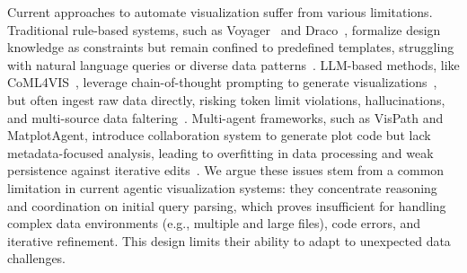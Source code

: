 \documentclass[11pt, a4paper, logo, copyright]{googlecloud}
\begin{document}
Current approaches to automate visualization suffer from various limitations. Traditional rule-based systems, such as Voyager~\citep{10.1145/3025453.3025768,7192728} and Draco~\citep{yang2023draco}, formalize design knowledge as constraints but remain confined to predefined templates, struggling with natural language queries or diverse data patterns~\citep{wu2024automated,hoque2025natural}. 
LLM-based methods, like CoML4VIS~\citep{chen2024viseval}, leverage chain-of-thought prompting to generate visualizations~\citep{comanici2025gemini}, but often ingest raw data directly, risking token limit violations, hallucinations, and multi-source data faltering~\citep{bai2024hallucination,chen2024viseval}.
Multi-agent frameworks, such as VisPath and MatplotAgent, introduce collaboration system to generate plot code but lack metadata-focused analysis, leading to overfitting in data processing and weak persistence against iterative edits~\citep{seo2025automated,yang2024matplotagent}. 
We argue these issues stem from a common limitation in current agentic visualization systems: they concentrate reasoning and coordination on initial query parsing, which proves insufficient for handling complex data environments (e.g., multiple and large files), code errors, and iterative refinement. This design limits their ability to
adapt to unexpected data challenges.
\end{document}
